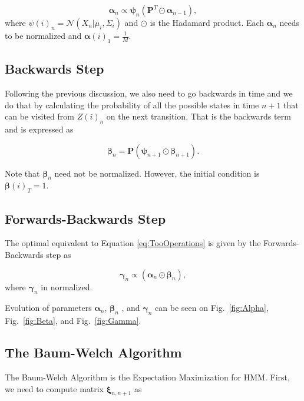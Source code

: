 \documentclass[letterpaper, 10 pt, conference]{ieeeconf}  %
\begin{document}
\begin{equation*}
    \bm{\alpha}_{n} \varpropto \bm{\psi}_{n} ( \mathbf{P}^T \odot \bm{\alpha}_{n-1}),
\end{equation*}
where $ \psi(i)_{n} = \mathcal{N}(X_{n}|\mu_{i},\Sigma_{i})$ and $\odot$ is the Hadamard product. Each $ \bm{\alpha}_{n}$ needs to be normalized and  $ \bm{\alpha}(i)_{1} = \frac{1}{M}$.

\subsection{Backwards Step}
\label{sec:TheoryBackwardsStep}

Following the previous discussion, we also need to go backwards in time and we do that by calculating  the probability of all the possible states in time $n+1$ that can be visited
from $Z(i)_{n}$ on the next transition. That is the backwards term and is expressed as 

\begin{equation*}
    \bm{\beta}_{n} = \mathbf{P} ( \bm{\psi}_{n+1} \odot \bm{\beta}_{n+1}).
\end{equation*}

Note that $\bm{\beta}_{n}$ need not be normalized. However, the initial condition is $\bm{\beta}(i)_{T} = 1$.


\subsection{Forwards-Backwards Step}
\label{sec:TheoryForwardsBackwardsStep}

The optimal equivalent to Equation \ref{eq:TooOperations} is given by the Forwards-Backwards step as

\begin{equation*}
    \bm{\gamma}_{n} \varpropto ( \bm{\alpha}_{n} \odot \bm{\beta}_{n}),
\end{equation*}
where $\bm{\gamma}_{n}$ in normalized.

Evolution of parameters $\bm{\alpha}_{n}$, $\bm{\beta}_{n}$ , and $ \bm{\gamma}_{n}$ can be seen on Fig.~\ref{fig:Alpha}, Fig.~\ref{fig:Beta}, and
Fig.~\ref{fig:Gamma}.

\subsection{The Baum-Welch Algorithm}
\label{sec:TheoryBaumWelchAlgorithm}

The Baum-Welch Algorithm is the Expectation Maximization for HMM.  First, we need to compute matrix $\bm{\xi}_{n,n+1}$ as 
\end{document}
